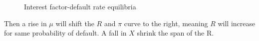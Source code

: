 \documentclass{article}
\newcommand{\?}{\textcolor{red}{(?)}} %
\begin{document}
\begin{figure}[H]
            \caption{Interest factor-default rate equilibria}
            
        \end{figure}
        
        Then a rise in $\mu$ will shift the $R$ and $\pi$ curve to the right, meaning $R$ will increase for same probability of default. A fall in $X$ shrink the span of the R.
    
    
\end{document}

